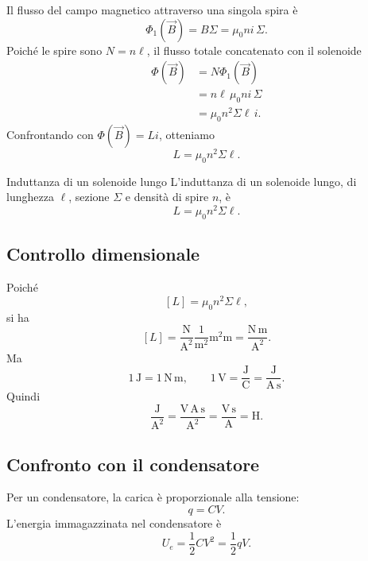 \documentclass[a4paper]{article}
\begin{document}
\begin{center}
\end{center}

Il flusso del campo magnetico attraverso una singola spira è
\[
\Phi_1(\vec{B})=B\Sigma=\mu_0 n i\,\Sigma.
\]
Poiché le spire sono \(N=n\ell\), il flusso totale concatenato con il solenoide
\begin{align*}
\Phi(\vec{B})
&=N\Phi_1(\vec{B}) \\
&=n\ell\,\mu_0 n i\,\Sigma \\
&=\mu_0 n^2\Sigma\ell\,i.
\end{align*}
Confrontando con \(\Phi(\vec{B})=Li\), otteniamo
\[
L=\mu_0 n^2\Sigma\ell.
\]

\begin{snippettheorem}{Induttanza di un solenoide lungo}
L'induttanza di un solenoide lungo, di lunghezza \(\ell\), sezione \(\Sigma\) e densità di spire \(n\), è
\[
    L=\mu_0 n^2\Sigma\ell.
\]
\end{snippettheorem}

\subsection{Controllo dimensionale}

Poiché
\[
[L]=\mu_0 n^2\Sigma\ell,
\]
si ha
\[
[L]=\frac{\mathrm{N}}{\mathrm{A}^2}\frac{1}{\mathrm{m}^2}\mathrm{m}^2\mathrm{m}
=\frac{\mathrm{N}\,\mathrm{m}}{\mathrm{A}^2}.
\]
Ma
\[
1\,\mathrm{J}=1\,\mathrm{N}\,\mathrm{m},
\qquad
1\,\mathrm{V}=\frac{\mathrm{J}}{\mathrm{C}}=\frac{\mathrm{J}}{\mathrm{A}\,\mathrm{s}}.
\]
Quindi
\[
\frac{\mathrm{J}}{\mathrm{A}^2}
=\frac{\mathrm{V}\,\mathrm{A}\,\mathrm{s}}{\mathrm{A}^2}
=\frac{\mathrm{V}\,\mathrm{s}}{\mathrm{A}}
=\mathrm{H}.
\]

\subsection{Confronto con il condensatore}

Per un condensatore, la carica è proporzionale alla tensione:
\[
q=CV.
\]
L'energia immagazzinata nel condensatore è
\[
U_e=\frac{1}{2}CV^2=\frac{1}{2}qV.
\]
\end{document}
